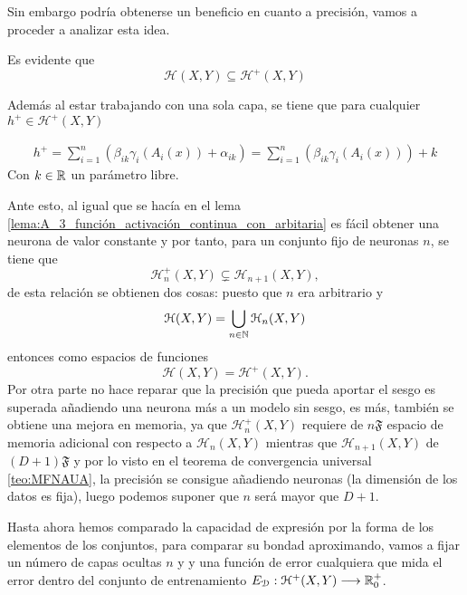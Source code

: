Sin embargo podría obtenerse un beneficio en cuanto a precisión, 
vamos a proceder  a analizar esta idea. 

Es evidente que 
\begin{equation} \label{eq:conjuntos-redes-neuronales-con-sesgo-contiene-elemental}
    \mathcal{H}(X,Y) \subseteq \mathcal{H}^+(X,Y)
\end{equation}

Además al estar trabajando con una sola capa, se tiene que para cualquier 
$h^+ \in \mathcal{H}^+(X,Y)$

\begin{align}
    h^+ = \sum_{i=1}^{n} \left(\beta_{i k} \gamma_{i}( A_{i}(x)) + \alpha_{i k} \right)
    = \sum_{i=1}^{n} \left(\beta_{i k} \gamma_{i}( A_{i}(x))\right) + k 
\end{align}
Con $k \in \mathbb{R}$ un parámetro libre.

Ante esto, al igual que se hacía en el lema \ref{lema:A_3_función_activación_continua_con_arbitaria}
es fácil obtener una neurona de valor constante y por tanto, para un conjunto fijo de neuronas $n$, se tiene que 
\begin{equation}
    \mathcal{H}^+_n(X,Y) \subsetneq  \mathcal{H}_{n+1}(X,Y),
\end{equation}
de esta relación se obtienen dos cosas: 
puesto que $n$ era arbitrario y 
\begin{equation}
    \mathcal{H}(X,Y) = \bigcup_{n \in \mathbb{N}} \mathcal{H}_n (X,Y)
\end{equation}
entonces como espacios de funciones 
\begin{equation}
    \mathcal{H}(X,Y) = \mathcal{H}^+ (X,Y).
\end{equation}
Por otra parte no hace reparar que la precisión que pueda aportar el sesgo es
superada añadiendo una neurona más a un modelo sin sesgo, es más, también se obtiene una mejora en memoria, ya que 
$\mathcal{H}^+_n(X,Y)$ requiere de $n \mathfrak{F}$ espacio de memoria adicional con respecto a $\mathcal{H}_n(X,Y)$
mientras que $\mathcal{H}_{n+1}(X,Y)$ de $(D +1) \mathfrak{F}$
y por lo visto en el teorema de convergencia universal \ref{teo:MFNAUA}, la precisión se consigue añadiendo neuronas (la dimensión de los datos es fija),
luego podemos suponer que $n$ será mayor que $D+1$. 

Hasta ahora hemos comparado la capacidad de expresión 
por la forma de los elementos de los conjuntos, para comparar su bondad aproximando, vamos a fijar  un 
 número de capas ocultas $n$ y 
 y una función de error cualquiera que mida el error dentro 
 del conjunto de entrenamiento
 $E_{\mathcal{D}}:\mathcal{H}^+(X,Y) \longrightarrow \mathbb{R}^+_0$.
 
